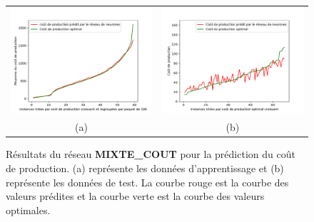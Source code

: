 \begin{figure}[H]
	\centering
	\begin{tabular}{c c}
		\includegraphics[width=9cm]{images_these/prediction_courbe_Al_He_complet_train.pdf}&
		\includegraphics[width=9cm]{images_these/prediction_courbe_Al_He_complet_test.pdf} 
		\\
		(a) & (b)
	\end{tabular}
	\caption[Résultats du  réseau MIXTE\_COUT]{Résultats du  réseau \textbf{MIXTE\_COUT} pour la prédiction du coût de production. (a) représente les données d'apprentissage et (b) représente les données de test. La courbe rouge est la courbe des valeurs prédites et la courbe verte est la courbe des valeurs optimales.}\label{6000_prediction_courbe_Al_He_complet}
\end{figure}

